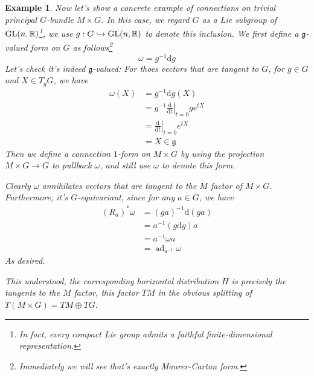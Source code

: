 \documentclass[11pt]{amsart}
\numberwithin{equation}{section}
\theoremstyle{plain}
\theoremstyle{plain}
\newtheorem{exsub}[thmsub]{Example}
\numberwithin{equation}{section}
\begin{document}
\begin{exsub}\normalfont
Now let's show a concrete example of connections on trivial principal $G$-bundle $M\times G$. In this case, we regard $G$ as a Lie subgroup of $\operatorname{GL}(n,\Bbb{R})$\footnote{In fact, every compact Lie group admits a faithful finite-dimensional representation.}, we use $g:G\hookrightarrow\operatorname{GL}(n,\Bbb{R})$ to denote this inclusion. We first define a $\mathfrak{g}$-valued form on $G$ as follows\footnote{Immediately we will see that's exactly Maurer-Cartan form.}
$$
\omega=g^{-1}\mathrm{d}g
$$
Let's check it's indeed $\mathfrak{g}$-valued: For thoes vectors that are tangent to $G$, for $g\in G$ and $X\in T_{g}G$, we have
$$
\begin{aligned}
\omega(X)&=g^{-1}\mathrm{d}g(X)\\
&=g^{-1}\left.\frac{\mathrm{d}}{\mathrm{d}t}\right|_{t=0}ge^{tX}\\
&=\left.\frac{\mathrm{d}}{\mathrm{d}t}\right|_{t=0}e^{tX}\\
&=X\in\mathfrak{g}
\end{aligned}
$$
Then we define a connection $1$-form on $M\times G$ by using the projection $M\times G\to G$ to pullback $\omega$, and still use $\omega$ to denote this form.

Clearly $\omega$ annihilates vectors that are tangent to the $M$ factor of $M\times G$. Furthermore, it's $G$-equivariant, since for any $a\in G$, we have
$$
\begin{aligned}
(R_a)^*\omega&=(ga)^{-1}\mathrm{d}(ga)\\
&=a^{-1}(g\mathrm{d}g)a\\
&=a^{-1}\omega a\\
&=\operatorname{ad}_{a^{-1}}\omega
\end{aligned}
$$
As desired.

This understood, the corresponding horizontal distribution $H$ is precisely the tangents to the $M$ factor, this factor $TM$ in the obvious splitting of $T(M\times G)=TM\oplus TG$.
\end{exsub}
\end{document}
